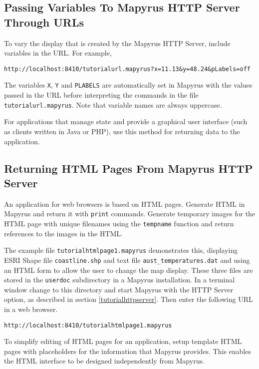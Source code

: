 

\subsection{Passing Variables To Mapyrus HTTP Server Through URLs}
\label{urlvariables}

To vary the display that is created by the Mapyrus HTTP Server, include
variables in the URL.  For example,

\begin{verbatim}
http://localhost:8410/tutorialurl.mapyrus?x=11.13&y=48.24&pLabels=off
\end{verbatim}

The variables \texttt{X}, \texttt{Y}
and \texttt{PLABELS} are automatically set in Mapyrus with the values
passed in the URL before interpreting
the commands in the file \texttt{tutorialurl.mapyrus}.
Note that variable names are always uppercase.

For applications that manage state
and provide a graphical user interface (such as clients written in
Java or PHP), use this method for returning data to the
application.

\subsection{Returning HTML Pages From Mapyrus HTTP Server}

An application for web browsers is based on HTML pages.
Generate HTML in Mapyrus and return it with \texttt{print} commands.
Generate temporary images for the HTML page with
unique filenames using the
\texttt{tempname}
function and return references to the images in the HTML.

The example file \texttt{tutorialhtmlpage1.mapyrus} demonstrates
this, displaying ESRI Shape file
\texttt{coastline.shp}
and text file
\texttt{aust\_temperatures.dat}
and using an HTML form to allow
the user to change the map display.
These three files are stored in the \texttt{userdoc} subdirectory
in a Mapyrus installation.
In a terminal window change to this directory and
start Mapyrus with the HTTP Server option, as described in section
\ref{tutorialhttpserver}.
Then enter the following URL in a web browser.

\begin{verbatim}
http://localhost:8410/tutorialhtmlpage1.mapyrus
\end{verbatim}

To simplify editing of HTML pages for an application, setup
template HTML pages with placeholders for the information that
Mapyrus provides.  This enables the HTML interface to be designed
independently from Mapyrus.


